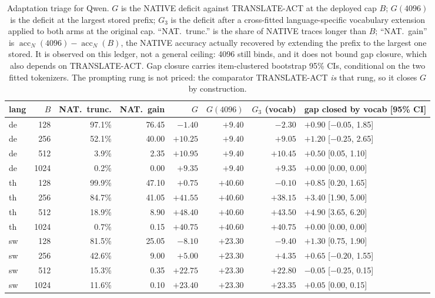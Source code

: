 \documentclass[11pt]{article}
\begin{document}
\begin{table}[t]
\centering
\small
\caption{Adaptation triage for Qwen. \(G\) is the NATIVE deficit against
TRANSLATE-ACT at the deployed cap \(B\); \(G(4096)\) is the deficit at the
largest stored prefix; \(G_3\) is the deficit after a cross-fitted
language-specific vocabulary extension applied to both arms at the original
cap. ``NAT.\ trunc.'' is the share of NATIVE traces longer than \(B\); ``NAT.\
gain'' is \(\operatorname{acc}_N(4096)-\operatorname{acc}_N(B)\), the NATIVE
accuracy actually recovered by extending the prefix to the largest one stored.
It is observed on this ledger, not a general ceiling: 4096 still binds, and it
does not bound gap closure, which also depends on TRANSLATE-ACT. Gap closure carries item-clustered bootstrap
95\% CIs, conditional on the two fitted tokenizers. The prompting rung is not
priced: the comparator TRANSLATE-ACT \emph{is} that rung, so it closes \(G\) by
construction.}
\label{tab:ladder}
\begin{tabular}{lrrrrrrl}
\toprule
lang & \(B\) & NAT.\ trunc. & NAT.\ gain & \(G\) & \(G(4096)\) & \(G_3\) (vocab) & gap closed by vocab [95\% CI] \\
\midrule
de & 128  & 97.1\% & 76.45 & \(-1.40\)  & \(+9.40\)  & \(-2.30\)  & \(+0.90\) [\(-0.05\), 1.85] \\
de & 256  & 52.1\% & 40.00 & \(+10.25\) & \(+9.40\)  & \(+9.05\)  & \(+1.20\) [\(-0.25\), 2.65] \\
de & 512  & 3.9\%  & 2.35  & \(+10.95\) & \(+9.40\)  & \(+10.45\) & \(+0.50\) [0.05, 1.10] \\
de & 1024 & 0.2\%  & 0.00  & \(+9.35\)  & \(+9.40\)  & \(+9.35\)  & \(+0.00\) [0.00, 0.00] \\
\midrule
th & 128  & 99.9\% & 47.10 & \(+0.75\)  & \(+40.60\) & \(-0.10\)  & \(+0.85\) [0.20, 1.65] \\
th & 256  & 84.7\% & 41.05 & \(+41.55\) & \(+40.60\) & \(+38.15\) & \(+3.40\) [1.90, 5.00] \\
th & 512  & 18.9\% & 8.90  & \(+48.40\) & \(+40.60\) & \(+43.50\) & \(+4.90\) [3.65, 6.20] \\
th & 1024 & 0.7\%  & 0.15  & \(+40.75\) & \(+40.60\) & \(+40.75\) & \(+0.00\) [0.00, 0.00] \\
\midrule
sw & 128  & 81.5\% & 25.05 & \(-8.10\)  & \(+23.30\) & \(-9.40\)  & \(+1.30\) [0.75, 1.90] \\
sw & 256  & 42.6\% & 9.00  & \(+5.00\)  & \(+23.30\) & \(+4.35\)  & \(+0.65\) [\(-0.20\), 1.55] \\
sw & 512  & 15.3\% & 0.35  & \(+22.75\) & \(+23.30\) & \(+22.80\) & \(-0.05\) [\(-0.25\), 0.15] \\
sw & 1024 & 11.6\% & 0.10  & \(+23.40\) & \(+23.30\) & \(+23.35\) & \(+0.05\) [0.00, 0.15] \\
\bottomrule
\end{tabular}
\end{table}
\end{document}
